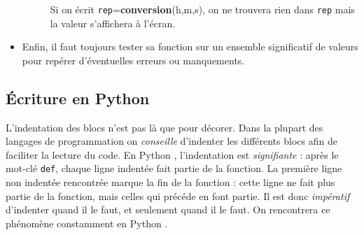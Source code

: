 \begin{rem}
\begin{itemize}
\begin{description}
Si on écrit \texttt{rep}=\textbf{conversion}(h,m,s), on  ne trouvera rien dans \texttt{rep} mais la 
valeur s'affichera à l'écran.
\end{description}



	\item Enfin, il faut toujours tester sa fonction sur un ensemble significatif de valeurs 
pour repérer d'éventuelles erreurs ou manquements.
\end{itemize}
\end{rem} 

\subsection{\'Ecriture en Python }


\begin{rem}
 L'indentation des blocs n'est pas là que pour décorer. Dans la plupart des langages de 
programmation on \emph{conseille} d'indenter les différents blocs afin de faciliter la lecture du 
code. En Python , l'indentation est \emph{signifiante} : après le mot-clé \texttt{def}, chaque 
ligne indentée fait partie de la fonction. La première ligne non indentée rencontrée marque la 
fin de la fonction : cette ligne ne fait plus partie de la fonction, mais celles qui précéde en 
font partie. Il est donc \emph{impératif} d'indenter quand il le faut, et seulement 
quand il le faut. On rencontrera ce phénomène constamment en Python .
\end{rem}
